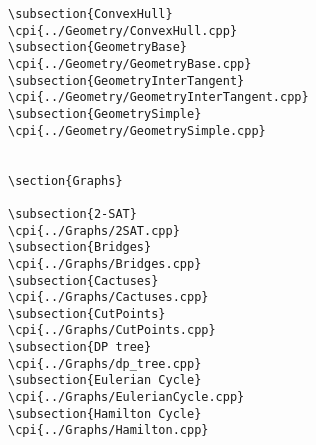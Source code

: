 {\begin{verbatim}
\subsection{ConvexHull}
\cpi{../Geometry/ConvexHull.cpp}
\subsection{GeometryBase}
\cpi{../Geometry/GeometryBase.cpp}
\subsection{GeometryInterTangent}
\cpi{../Geometry/GeometryInterTangent.cpp}
\subsection{GeometrySimple}
\cpi{../Geometry/GeometrySimple.cpp}


\section{Graphs}

\subsection{2-SAT}
\cpi{../Graphs/2SAT.cpp}
\subsection{Bridges}
\cpi{../Graphs/Bridges.cpp}
\subsection{Cactuses}
\cpi{../Graphs/Cactuses.cpp}
\subsection{CutPoints}
\cpi{../Graphs/CutPoints.cpp}
\subsection{DP tree}
\cpi{../Graphs/dp_tree.cpp}
\subsection{Eulerian Cycle}
\cpi{../Graphs/EulerianCycle.cpp}
\subsection{Hamilton Cycle}
\cpi{../Graphs/Hamilton.cpp}

\end{verbatim}}

